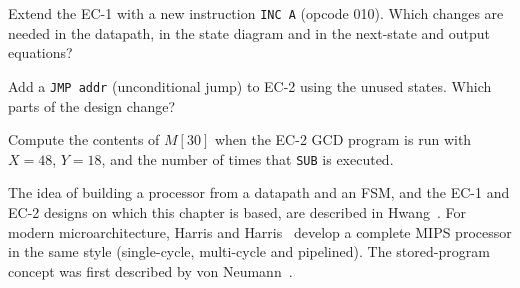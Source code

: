 \begin{exlist}
  \item Extend the EC-1 with a new instruction \texttt{INC A} (opcode 010). Which changes are needed in the datapath, in the state diagram and in the next-state and output equations?
  \item Add a \texttt{JMP addr} (unconditional jump) to EC-2 using the unused states. Which parts of the design change?
  \item Compute the contents of $M[30]$ when the EC-2 GCD program is run with $X=48$, $Y=18$, and the number of times that \texttt{SUB} is executed.
\end{exlist}

The idea of building a processor from a datapath and an FSM, and the EC-1 and EC-2 designs on which this chapter is based, are described in Hwang~\cite{hwang2005,hwang2018}. For modern microarchitecture, Harris and Harris~\cite{harris2012} develop a complete MIPS processor in the same style (single-cycle, multi-cycle and pipelined). The stored-program concept was first described by von Neumann~\cite{vonneumann1945}.
